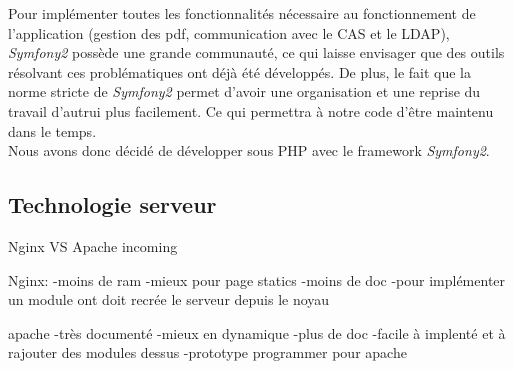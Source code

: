 Pour implémenter toutes les fonctionnalités nécessaire au fonctionnement de l'application (gestion des pdf, communication avec le CAS et le LDAP), \textit{Symfony2} possède une grande communauté, ce qui laisse envisager que des outils résolvant ces problématiques ont déjà été développés.
De plus, le fait que la norme stricte de \textit{Symfony2} permet d'avoir une organisation et une reprise du travail d'autrui plus facilement. Ce qui permettra à notre code d'être maintenu dans le temps.\\

Nous avons donc décidé de développer sous PHP avec le framework \textit{Symfony2}.

\subsection{Technologie serveur}

Nginx VS Apache incoming



Nginx:
-moins de ram
-mieux pour page statics
-moins de doc
-pour implémenter un module ont doit \og recrée \fg{} le serveur depuis le noyau

apache
-très documenté
-mieux en dynamique
-plus de doc
-facile à implenté et à rajouter des modules dessus
-prototype programmer pour apache

